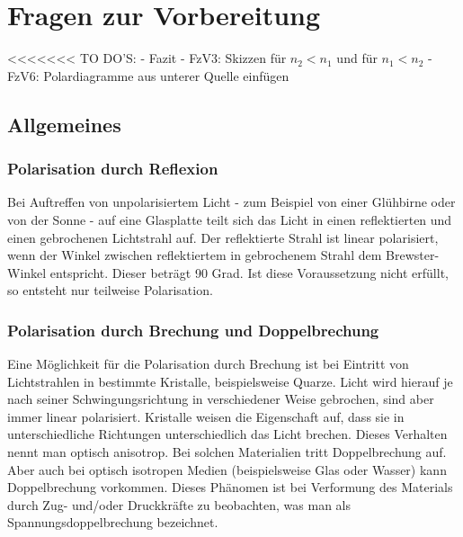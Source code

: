 

\chapter{Fragen zur Vorbereitung}
\label{chap:fvz}




<<<<<<< TO DO'S:
- Fazit
- FzV3: Skizzen für $n_2<n_1$ und für $n_1<n_2$
- FzV6: Polardiagramme aus unterer Quelle einfügen

\section{Allgemeines}

\subsection*{Polarisation durch Reflexion}
Bei Auftreffen von unpolarisiertem Licht - zum Beispiel von einer Glühbirne oder von der Sonne - auf eine Glasplatte teilt sich das Licht in einen reflektierten und einen gebrochenen Lichtstrahl auf. 
Der reflektierte Strahl ist  linear polarisiert, wenn der Winkel zwischen reflektiertem in gebrochenem Strahl dem Brewster-Winkel entspricht. Dieser beträgt 90 Grad. Ist diese Voraussetzung nicht erfüllt, so entsteht nur teilweise Polarisation. 

\subsection*{Polarisation durch Brechung und Doppelbrechung}
Eine Möglichkeit für die Polarisation durch Brechung ist bei Eintritt von Lichtstrahlen in bestimmte Kristalle, beispielsweise Quarze. Licht wird hierauf je nach seiner Schwingungsrichtung in verschiedener Weise gebrochen, sind aber immer linear polarisiert. 
Kristalle weisen die Eigenschaft auf, dass sie in unterschiedliche Richtungen unterschiedlich das Licht brechen. Dieses Verhalten nennt man optisch anisotrop. Bei solchen Materialien tritt Doppelbrechung auf. Aber auch bei optisch isotropen Medien (beispielsweise Glas oder Wasser) kann Doppelbrechung vorkommen. Dieses Phänomen ist  bei Verformung des Materials durch Zug- und/oder Druckkräfte zu beobachten, was man als Spannungsdoppelbrechung bezeichnet. 

